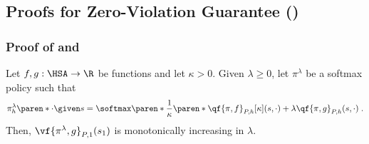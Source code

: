 \subsection{Proofs for Zero-Violation Guarantee ()}

\subsubsection{Proof of  and }\label{subsec:safe-softmax-policy-exists-proof}

\begin{lemma}\label{lemma:softmax-value-monotonicity}
Let $f, g: \HSA \to \R$ be functions and let $\kappa > 0$. 
Given $\lambda \geq 0$, let $\pi^\lambda$ be a softmax policy such that 
\begin{align*}
\pi^\lambda_h \paren*{\cdot \given s} = \softmax\paren*{\frac{1}{\kappa}\paren*{
    \qf{\pi, f}_{P, h}[\kappa](s, \cdot)
    + \lambda \qf{\pi, g}_{P, h}(s, \cdot)}}\;.
\end{align*}
Then, \(\vf{\pi^\lambda, g}_{P, 1}(s_1)\) is monotonically increasing in $\lambda$.
\end{lemma}
